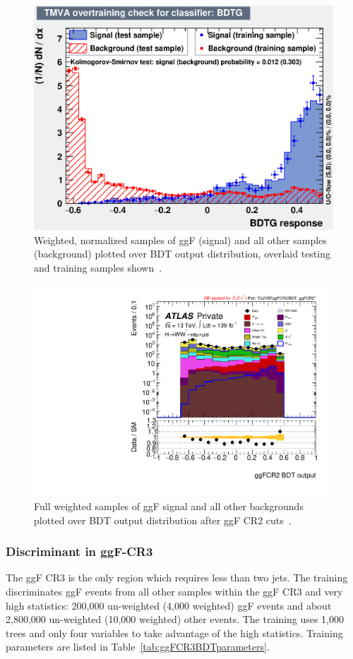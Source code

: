 \begin{figure}[!htbp]
\centering
  \includegraphics[width=.45\linewidth]{Pictures/ggFCR2/overtrain_BDTG.eps}
\caption{Weighted, normalized samples of ggF (signal) and all other samples (background) plotted over BDT output distribution, overlaid testing and training samples shown~\cite{ourSupportNote}.}
\label{fig:ggFCR2BDTresult}
\end{figure}

\begin{figure}[!htbp]
\centering
  \includegraphics[width=.45\linewidth]{Pictures/run2-emme-CutVBFggFCR2-BDT_ggFCR2-log.pdf}
\caption{Full weighted samples of ggF signal and all other backgrounds plotted over BDT output distribution after ggF CR2 cuts~\cite{ourSupportNote}.}
\label{fig:ggFCR2BDTresult2}
\end{figure}

\newpage

\subsubsection{Discriminant in ggF-CR3}
The ggF CR3 is the only region which requires less than two jets. The training discriminates ggF events from all other samples within the ggF CR3 and very high statistics: 200,000 un-weighted (4,000 weighted) ggF events and about 2,800,000 un-weighted (10,000 weighted) other events. The training uses 1,000 trees and only four variables to take advantage of the high statistics. Training parameters are listed in Table~\ref{tab:ggFCR3BDTparameters}.

